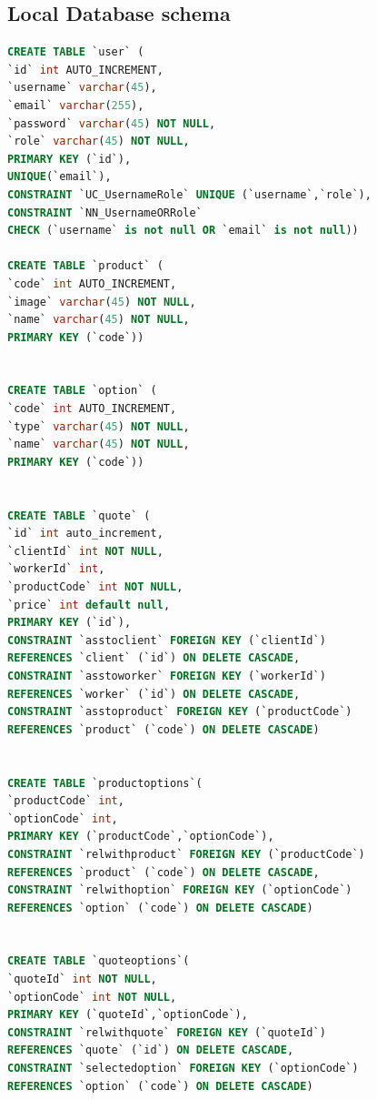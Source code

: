 \documentclass[a4paper, 12pt]{article}
\begin{document}
\subsection{Local Database schema}
\begin{lstlisting}[language=SQL]
CREATE TABLE `user` (
`id` int AUTO_INCREMENT,
`username` varchar(45),
`email` varchar(255),
`password` varchar(45) NOT NULL,
`role` varchar(45) NOT NULL,
PRIMARY KEY (`id`),
UNIQUE(`email`),
CONSTRAINT `UC_UsernameRole` UNIQUE (`username`,`role`),
CONSTRAINT `NN_UsernameORRole` 
CHECK (`username` is not null OR `email` is not null))

CREATE TABLE `product` (
`code` int AUTO_INCREMENT,
`image` varchar(45) NOT NULL,
`name` varchar(45) NOT NULL,
PRIMARY KEY (`code`))


CREATE TABLE `option` (
`code` int AUTO_INCREMENT,
`type` varchar(45) NOT NULL,
`name` varchar(45) NOT NULL,
PRIMARY KEY (`code`))


CREATE TABLE `quote` (
`id` int auto_increment,
`clientId` int NOT NULL,
`workerId` int,
`productCode` int NOT NULL,
`price` int default null,
PRIMARY KEY (`id`),
CONSTRAINT `asstoclient` FOREIGN KEY (`clientId`) 
REFERENCES `client` (`id`) ON DELETE CASCADE,
CONSTRAINT `asstoworker` FOREIGN KEY (`workerId`) 
REFERENCES `worker` (`id`) ON DELETE CASCADE,
CONSTRAINT `asstoproduct` FOREIGN KEY (`productCode`) 
REFERENCES `product` (`code`) ON DELETE CASCADE)


CREATE TABLE `productoptions`(
`productCode` int,
`optionCode` int,
PRIMARY KEY (`productCode`,`optionCode`),
CONSTRAINT `relwithproduct` FOREIGN KEY (`productCode`) 
REFERENCES `product` (`code`) ON DELETE CASCADE,
CONSTRAINT `relwithoption` FOREIGN KEY (`optionCode`) 
REFERENCES `option` (`code`) ON DELETE CASCADE)


CREATE TABLE `quoteoptions`(
`quoteId` int NOT NULL,
`optionCode` int NOT NULL,
PRIMARY KEY (`quoteId`,`optionCode`),
CONSTRAINT `relwithquote` FOREIGN KEY (`quoteId`) 
REFERENCES `quote` (`id`) ON DELETE CASCADE,
CONSTRAINT `selectedoption` FOREIGN KEY (`optionCode`) 
REFERENCES `option` (`code`) ON DELETE CASCADE)
\end{lstlisting}
\end{document}
